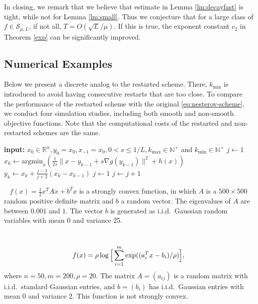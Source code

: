 \documentclass[twoside,11pt]{article}
\newcommand{\R}{\mathbb{R}}
\def\half{\frac{1}{2}}
\def\iid{\textrm{i.i.d.~}}
\begin{document}
In closing, we remark that we believe that estimate in Lemma \ref{lm:decayfast} is tight, while not for Lemma \ref{lm:small}. Thus we conjecture that for a large class of $f\in\mathcal{S}_{\mu,L}$, if not all, $T = O(\sqrt{L}/\mu)$. If this is true, the exponent constant $c_2$ in Theorem \ref{exp} can be significantly improved.

\subsection{Numerical Examples}\label{sec:numerical-examples}
Below we present a discrete analog to the restarted scheme. There,
$k_{\min}$ is introduced to avoid having consecutive restarts that are
too close. To compare the performance of the restarted scheme with the
original \eqref{eq:nesterov-scheme}, we conduct four simulation
studies, including both smooth and non-smooth objective
functions. Note that the computational costs of the restarted and
non-restarted schemes are the same.

\begin{algorithm}[H]
\caption{Speed Restarting Nesterov's Scheme}
\label{alg:restart}
\begin{algorithmic}
\STATE \textbf{input:} $x_0\in\R^n, y_0 = x_0, x_{-1} = x_0, 0 < s \le 1/L, k_{\max}\in\mathbb{N}^+$ and $k_{\min}\in\mathbb{N}^+$
\STATE $j \gets 1$
\STATE $x_k \gets \mbox{argmin}_x(\frac{1}{2s}\|x - y_{k-1} + s\nabla g(y_{k-1})\|^2 + h(x))$
\STATE $y_k \gets x_k + \frac{j-1}{j+2}(x_k - x_{k-1})$
\STATE $j \gets 1$
\ELSE
\STATE $j \gets j + 1$
\ENDIF
\ENDFOR
\end{algorithmic}
\end{algorithm}

~ $f(x) = \half x^TAx + b^Tx$ is a strongly
convex function, in which $A$ is a $500\times 500$ random positive
definite matrix and $b$ a random vector. The eigenvalues of $A$ are
between $0.001$ and $1$. The vector $b$ is generated as \iid Gaussian
random variables with mean 0 and variance 25.

\vspace{0.4em}
~
\begin{equation}\nonumber
f(x) = \rho\log\Big{[}\sum_{i=1}^m\exp((a_i^Tx - b_i)/\rho)\Big{]},
\end{equation}
where $n = 50, m = 200, \rho = 20$. The matrix $A = (a_{ij})$ is a
random matrix with \iid standard Gaussian entries, and $b = (b_i)$ has \iid Gaussian entries with mean $0$ and variance $2$. This function
is not strongly convex.
\end{document}
